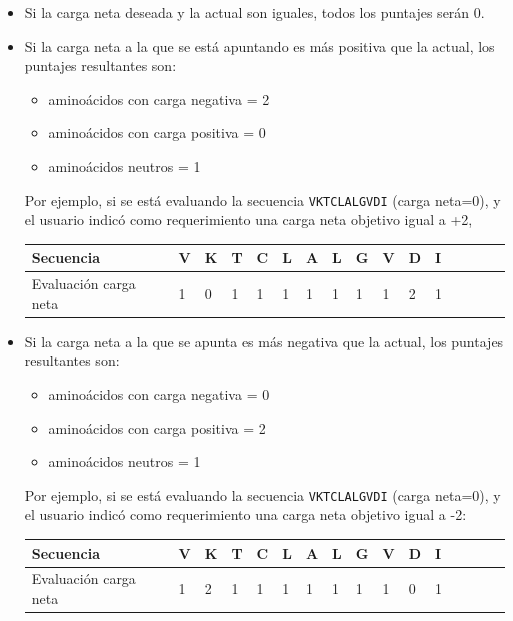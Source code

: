 \begin{itemize}
  \item Si la carga neta deseada y la actual son iguales, todos los puntajes serán 0.
 
\item Si la carga neta a la que se está apuntando es más positiva que la actual, los puntajes resultantes son: 
  \begin{itemize}
   \item  aminoácidos con carga negativa = 2
  \item aminoácidos con carga positiva = 0
  \item aminoácidos neutros = 1
  \end{itemize}
Por ejemplo, si se está evaluando la secuencia \texttt{VKTCLALGVDI} (carga neta=0), y el usuario indicó como requerimiento una carga neta objetivo igual a +2, 
   
 
\begin{center}
  \begin{tabular}{llllllllllllllll} 
\hline
Secuencia & \textbf{V} & \textbf{K} & \textbf{T} & \textbf{C} & \textbf{L} & \textbf{A} & \textbf{L} & \textbf{G} & \textbf{V} & \textbf{D} & \textbf{I} \\ \hline
Evaluación carga neta & 1 & 0 & 1 & 1 & 1 & 1 & 1 & 1 & 1 & 2 & 1  \\ \hline
\end{tabular}
\end{center}

 
 \item Si la carga neta a la que se apunta es más negativa que la actual, los puntajes resultantes son:
  \begin{itemize}
   \item  aminoácidos con carga negativa = 0
  \item aminoácidos con carga positiva = 2
  \item aminoácidos neutros = 1
  \end{itemize}

   Por ejemplo, si se está evaluando la secuencia \texttt{VKTCLALGVDI} (carga neta=0), y el usuario indicó como requerimiento una carga neta objetivo igual a -2:
   

   \begin{center}
\begin{tabular}{llllllllllllllll} 
\hline
Secuencia & \textbf{V} & \textbf{K} & \textbf{T} & \textbf{C} & \textbf{L} & \textbf{A} & \textbf{L} & \textbf{G} & \textbf{V} & \textbf{D} & \textbf{I}\\ \hline
Evaluación carga neta & 1 & 2 & 1 & 1 & 1 & 1 & 1 & 1 & 1 & 0 & 1  \\ \hline
\end{tabular}

   \end{center}
   
\end{itemize}





